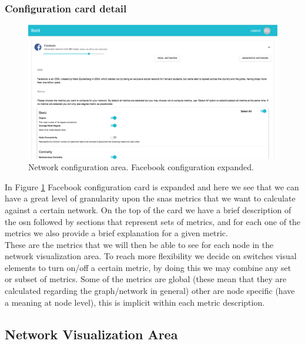 \subsubsection*{Configuration card detail}

\begin{figure}[h!]
\begin{center}
  \hspace*{-0.8in}
  \includegraphics[width=1.2\textwidth]{img/socii/socii_2_v2.png}
\end{center}
\caption{\label{img:socii_2} Network configuration area. Facebook configuration expanded.}
\end{figure}

In Figure \ref{img:socii_2} Facebook configuration card is expanded and here we see that we can have a great level of granularity upon the \glspl{sna} metrics that we want to calculate against a certain network. On the top of the card we have a brief description of the \gls{osn} followed by sections that represent sets of metrics, and for each one of the metrics we also provide a brief explanation for a given metric.\\
\indent These are the metrics that we will then be able to see for each node in the network visualization area. To reach more flexibility we decide on switches visual elements to turn on/off a certain metric, by doing this we may combine any set or subset of metrics. Some of the metrics are global (these mean that they are calculated regarding the graph/network in general) other are node specific (have a meaning at node level), this is implicit within each metric description.

\subsection{Network Visualization Area}

